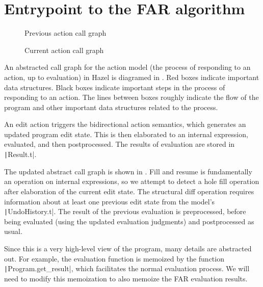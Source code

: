 
\section{Entrypoint to the FAR algorithm}
\label{sec:far-entrypoint}

\begin{figure}
  \centering
  
  \caption{Previous action call graph}
  \label{fig:prev-evaluation-call-graph}
\end{figure}

\begin{figure}
  \centering
  
  \caption{Current action call graph}
  \label{fig:current-evaluation-call-graph}
\end{figure}

An abstracted call graph for the action model (the process of responding to an action, up to evaluation) in Hazel is diagramed in . Red boxes indicate important data structures. Black boxes indicate important steps in the process of responding to an action. The lines between boxes roughly indicate the flow of the program and other important data structures related to the process.

An edit action triggers the bidirectional action semantics, which generates an updated program edit state. This is then elaborated to an internal expression, evaluated, and then postprocessed. The results of evaluation are stored in \texttt|Result.t|.

The updated abstract call graph is shown in . Fill and resume is fundamentally an operation on internal expressions, so we attempt to detect a hole fill operation after elaboration of the current edit state. The structural diff operation requires information about at least one previous edit state from the model's \texttt|UndoHistory.t|. The result of the previous evaluation is preprocessed, before being evaluated (using the updated evaluation judgments) and postprocessed as usual.

Since this is a very high-level view of the program, many details are abstracted out. For example, the evaluation function is memoized by the function \texttt|Program.get_result|, which facilitates the normal evaluation process. We will need to modify this memoization to also memoize the FAR evaluation results.

